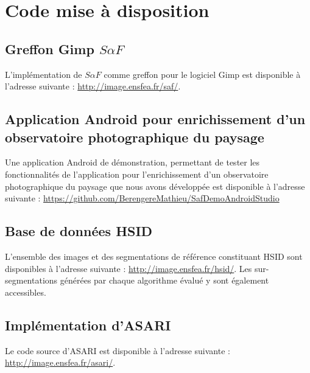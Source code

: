 \chapter{Code mise à disposition}
 
\section{Greffon Gimp $S \alpha F$}

L'implémentation de $S \alpha F$ comme greffon pour le logiciel Gimp est disponible à l'adresse suivante : \url{http://image.ensfea.fr/saf/}.

\section{Application Android pour enrichissement d'un observatoire photographique du paysage}

Une application Android de démonstration, permettant de tester les fonctionnalités de l'application pour l'enrichissement d'un observatoire photographique du paysage que nous avons développée est disponible à l'adresse suivante : \url{https://github.com/BerengereMathieu/SafDemoAndroidStudio}

\section{Base de données HSID}

L'ensemble des images et des segmentations de référence constituant HSID sont disponibles à l'adresse suivante : 
\url{http://image.ensfea.fr/hsid/}. Les sur-segmentations générées par chaque algorithme évalué y sont également accessibles.

\section{Implémentation d'ASARI}

Le code source d'ASARI est disponible à l'adresse suivante : \url{http://image.ensfea.fr/asari/}.